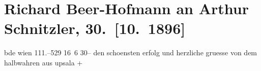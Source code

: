 

         
         \newcommand{\erwaehntePersonen}{Personen: }
         \newcommand{\erwaehnteInstitutionen}{}
         \newcommand{\erwaehnteOrte}{Orte: Berlin, Uppsala, Wien}
         \newcommand{\erwaehnteWerke}{Werke: Freiwild. Schauspiel in 3 Akten}
               \section[Richard Beer-Hofmann an Arthur Schnitzler, 30. {[}10. 1896{]}]{ Richard Beer-Hofmann an Arthur Schnitzler, 30. {[}10. 1896{]}}\nopagebreak{}\rehead{ }\begin{ledgroupsized}[t]{13cm}\normalsize\beginnumbering \toendnotes[C]{\smallbreak\pagebreak[2]} 
\toendnotes[C]{\smallbreak}\pstart
           \noindent{}{\pb}bde{ }wien 111.–529 16 6{ }30–\pend
           \pstart
           den schoensten erfolg und herzliche gruesse von
               dem halbwahren aus upsala +\pend
           
         
         \endnumbering{}\end{ledgroupsized}  \newcommand{\dateiname}{L00613}\newcommand{\titel}{Richard Beer-Hofmann an Arthur Schnitzler, 30. [10. 1896]}\newcommand{\editorInnen}{Martin Anton Müller und Gerd-Hermann Susen}
      